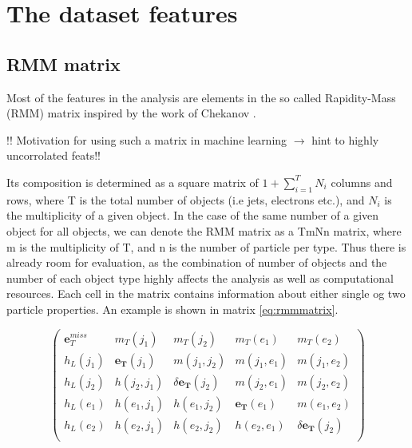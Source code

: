 \section*{The dataset features}

\subsection*{RMM matrix}
Most of the features in the analysis are elements in the so called Rapidity-Mass (RMM) matrix inspired by the work of Chekanov \cite{Chekanov_2019}.
\par
!! Motivation for using such a matrix in machine learning $\to$ hint to highly uncorrolated feats!!
\par
Its composition is determined as a square matrix of $1 + \sum_{i=1}^{T}N_i$ columns and rows, where T is the total number of objects (i.e jets, electrons etc.),
and $N_i$ is the multiplicity of a given object. In the case of the same number of a given object for all objects, we can denote the RMM matrix as a 
TmNn matrix, where m is the multiplicity of T, and n is the number of particle per type. Thus there is already room for evaluation, as the combination of number of objects 
and the number of each object type highly affects the analysis as well as computational resources. Each cell in the matrix contains information about
either single og two particle properties. An example is shown in matrix \ref{eq:rmmmatrix}.

\begin{equation}\label{eq:rmmmatrix}
\begin{pmatrix}
    \boldsymbol{e}_{T}^{miss} & m_T(j_1) & m_T(j_2) &  m_T(e_1) &  m_T(e_2)\\
    h_L(j_1) & \boldsymbol{e_T}(j_1) & m(j_1, j_2) & m(j_1, e_1) & m(j_1, e_2)\\
    h_L(j_2) & h(j_2, j_1) & \delta \boldsymbol{e_T}(j_2)& m(j_2, e_1) & m(j_2, e_2)\\
    h_L(e_1) & h(e_1, j_1) & h(e_1, j_2) & \boldsymbol{e_T}(e_1) & m(e_1, e_2)\\
    h_L(e_2) & h(e_2, j_1) & h(e_2, j_2) & h(e_2, e_1) & \delta \boldsymbol{e_T}(j_2)\\
\end{pmatrix}
\end{equation}

